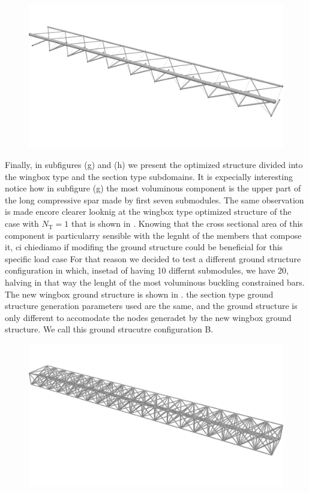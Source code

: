 \begin{figure}
    \centering
    \includegraphics[width=0.8\linewidth]{figures/07_aeronautic/00_NACA_c_1/04_Topology_cell_iso.png}
        \caption{}
    \label{fig:07_wingbox_a_nt1}
\end{figure}

Finally, in subfigures (g) and (h) we present the optimized structure divided into the wingbox type and the section type subdomains. It is expecially interesting notice how in subfigure (g) the most voluminous component is the upper part of the long compressive spar made by first seven submodules. The same observation is made encore clearer looknig at the wingbox type optimized structure of the case with $N_\text{T}=1$ that is shown in . Knowing that the cross sectional area of this component is particularry sensible with the legnht of the members that compose it, ci chiediamo if modifing the ground structure could be beneficial for this specific load case For that reason we decided to test a different ground structure configuration in which, insetad of having 10 differnt submodules, we have 20, halving in that way the lenght of the most voluminous buckling constrained bars. The new wingbox ground structure is shown in . the section type ground structure generation parameters used are the same, and the ground structure is only different to accomodate the nodes generadet by the new wingbox ground structure. We call this ground strucutre configuration B. 

\begin{figure}
    \centering
    \includegraphics[width=0.8\linewidth]{figures/07_aeronautic/00_NACA_gs_b/02_GS_c_iso.png}
        \caption{}
    \label{fig:07_gs_wingbox_b}
\end{figure}

